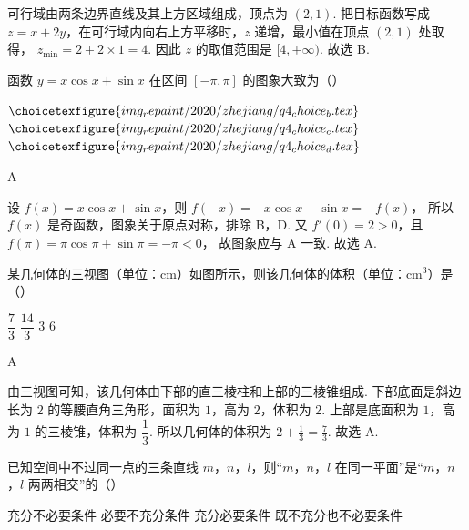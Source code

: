 \begin{solution}
可行域由两条边界直线及其上方区域组成，顶点为 \((2,1)\).
把目标函数写成 \(z=x+2y\)，在可行域内向右上方平移时，\(z\) 递增，最小值在顶点 \((2,1)\) 处取得，
\(z_{\min}=2+2\times1=4\).
因此 \(z\) 的取值范围是 \([4,+\infty)\). 故选 B.
\end{solution}

\begin{problem}
函数 \(y=x\cos x+\sin x\) 在区间 \([-\pi,\pi]\) 的图象大致为（\quad）

    {\(\choicetexfigure{img_repaint/2020/zhejiang/q4_choice_b.tex}\)}
    {\(\choicetexfigure{img_repaint/2020/zhejiang/q4_choice_c.tex}\)}
    {\(\choicetexfigure{img_repaint/2020/zhejiang/q4_choice_d.tex}\)}
\end{problem}

\begin{answer}
A
\end{answer}

\begin{solution}
设 \(f(x)=x\cos x+\sin x\)，则
\(f(-x)=-x\cos x-\sin x=-f(x)\)，
所以 \(f(x)\) 是奇函数，图象关于原点对称，排除 B，D.
又 \(f'(0)=2>0\)，且
\(f(\pi)=\pi\cos\pi+\sin\pi=-\pi<0\)，
故图象应与 A 一致. 故选 A.
\end{solution}

\begin{problem}
某几何体的三视图（单位：\(\mathrm{cm}\)）如图所示，则该几何体的体积（单位：\(\mathrm{cm}^3\)）是（\quad）

\begin{center}
\end{center}

\choices
    {\(\dfrac{7}{3}\)}
    {\(\dfrac{14}{3}\)}
    {\(3\)}
    {\(6\)}
\end{problem}

\begin{answer}
A
\end{answer}

\begin{solution}
由三视图可知，该几何体由下部的直三棱柱和上部的三棱锥组成.
下部底面是斜边长为 \(2\) 的等腰直角三角形，面积为 \(1\)，高为 \(2\)，体积为 \(2\).
上部是底面积为 \(1\)，高为 \(1\) 的三棱锥，体积为 \(\dfrac13\).
所以几何体的体积为
\(2+\frac13=\frac73\).
故选 A.
\end{solution}

\begin{problem}
已知空间中不过同一点的三条直线 \(m\)，\(n\)，\(l\)，则“\(m\)，\(n\)，\(l\) 在同一平面”是“\(m\)，\(n\)，\(l\) 两两相交”的（\quad）

\choices
    {充分不必要条件}
    {必要不充分条件}
    {充分必要条件}
    {既不充分也不必要条件}
\end{problem}

